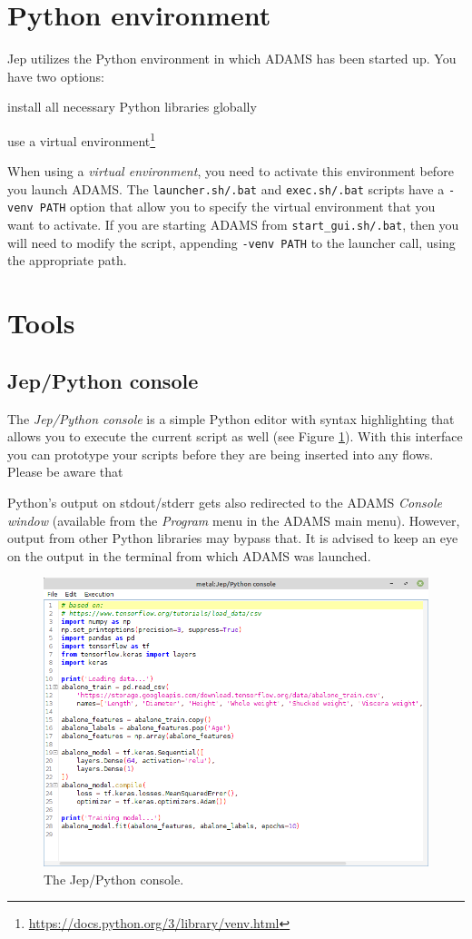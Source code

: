\documentclass[a4paper]{book}
\begin{document}
\clearpage
\section{Python environment}
Jep utilizes the Python environment in which ADAMS has been started up. You have two options:
\begin{tight_itemize}
    \item install all necessary Python libraries globally
    \item use a virtual environment\footnote{\url{https://docs.python.org/3/library/venv.html}{}}
\end{tight_itemize}

\noindent When using a \textit{virtual environment}, you need to activate this environment before you launch
ADAMS. The \texttt{launcher.sh/.bat} and \texttt{exec.sh/.bat} scripts have a \texttt{-venv PATH}
option that allow you to specify the virtual environment that you want to activate.
If you are starting ADAMS from \texttt{start\_gui.sh/.bat}, then you will need to modify
the script, appending \texttt{-venv PATH} to the launcher call, using the appropriate path.

\clearpage
\section{Tools}
\subsection{Jep/Python console}
The \textit{Jep/Python console} is a simple Python editor with syntax highlighting that allows you
to execute the current script as well (see Figure \ref{jep-console}). With this interface you can
prototype your scripts before they are being inserted into any flows. Please be aware that

Python's output on stdout/stderr gets also redirected to the ADAMS \textit{Console window} (available
from the \textit{Program} menu in the ADAMS main menu). However, output from other Python libraries
may bypass that. It is advised to keep an eye on the output in the terminal from which ADAMS was
launched.

\begin{figure}[ht]
	\centering
	\includegraphics[width=\textwidth]{images/jep-console.png}
	\caption{The Jep/Python console.}
	\label{jep-console}
\end{figure}



\end{document}
